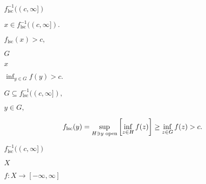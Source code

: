 \documentclass[10pt]{book}
\begin{document}
\begin{mdSnippets}
\begin{mdInlineSnippet}[9a7859563ae8bcfe2b67b09eb067e6f0]
$f_\text{lsc}^{-1}((c, \infty])$\end{mdInlineSnippet}%
\begin{mdInlineSnippet}[dda33429d47a479bd58c90c028c6a8dc]%
$x \in f_\text{lsc}^{-1}((c, \infty]).$\end{mdInlineSnippet}%
\begin{mdInlineSnippet}%
$f_\text{lsc}(x) > c,$\end{mdInlineSnippet}%
\begin{mdInlineSnippet}[dfcf28d0734569a6a693bc8194de62bf]%
$G$\end{mdInlineSnippet}%
\begin{mdInlineSnippet}[9dd4e461268c8034f5c8564e155c67a6]%
$x$\end{mdInlineSnippet}%
\begin{mdInlineSnippet}[fa6df5e05607277312d1916fbcb7e7f6]%
$\inf_{y \in G} f(y) > c.$\end{mdInlineSnippet}%
\begin{mdInlineSnippet}%
$G \subseteq f_\text{lsc}^{-1}((c, \infty]),$\end{mdInlineSnippet}%
\begin{mdInlineSnippet}[714cc660bd6eeb3c898a5b3a78bb1400]%
$y \in G,$\end{mdInlineSnippet}%
\begin{mdDisplaySnippet}%
\[%
f_\text{lsc}(y) = \sup_{H \ni y \text{ open}} \qty[\inf_{z \in H} f(z)]
\ge \inf_{z \in G} f(z) > c.
\]%
\end{mdDisplaySnippet}%
\begin{mdInlineSnippet}[9a7859563ae8bcfe2b67b09eb067e6f0]%
$f_\text{lsc}^{-1}((c, \infty])$\end{mdInlineSnippet}%
\begin{mdInlineSnippet}[02129bb861061d1a052c592e2dc6b383]%
$X$\end{mdInlineSnippet}%
\begin{mdInlineSnippet}[9c3729f1b2ef77b97bbdb1135d803c69]%
$f: X \to [-\infty, \infty]$\end{mdInlineSnippet}%
\begin{mdInlineSnippet}[06a6e69dcb4d7663fa24e77924a01c93]%

\end{mdInlineSnippet}
\end{mdSnippets}
\end{document}
